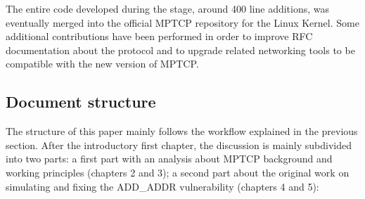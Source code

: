 The entire code developed during the stage, around 400 line additions, was eventually merged into the official MPTCP repository for the Linux Kernel. Some additional contributions have been performed in order to improve RFC documentation about the protocol and to upgrade related networking tools to be compatible with the new version of MPTCP.

\subsection{Document structure}
The structure of this paper mainly follows the workflow explained in the previous section. After the introductory first chapter, the discussion is mainly subdivided into two parts: a first part with an analysis about MPTCP background and working principles (chapters 2 and 3); a second part about the original work on simulating and fixing the ADD\_ADDR vulnerability (chapters 4 and 5):

